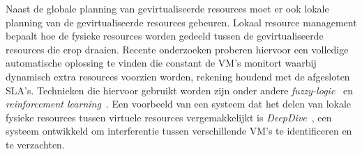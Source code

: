 Naast de globale planning van gevirtualiseerde resources moet er ook lokale planning van de gevirtualiseerde resources gebeuren. Lokaal resource management bepaalt hoe de fysieke resources worden gedeeld tussen de gevirtualiseerde resources die erop draaien. Recente onderzoeken proberen hiervoor een volledige automatische oplossing te vinden die constant de VM's monitort waarbij dynamisch extra resources voorzien worden, rekening houdend met de afgesloten SLA's. Technieken die hiervoor gebruikt worden zijn onder andere \textit{fuzzy-logic}~\cite{Xu2008} en \textit{reinforcement learning}~\cite{Rao2011}. Een voorbeeld van een systeem dat het delen van lokale fysieke resources tussen virtuele resources vergemakkelijkt is \textit{DeepDive}~\cite{Novakovic2013}, een systeem ontwikkeld om interferentie tussen verschillende VM's te identificeren en te verzachten.

